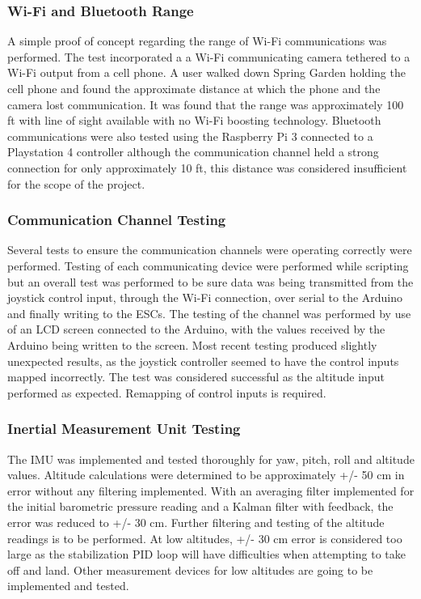   \subsubsection{Wi-Fi and Bluetooth Range}
  
  A simple proof of concept regarding the range of Wi-Fi communications was performed. The test incorporated a a Wi-Fi communicating camera tethered to a Wi-Fi output from a cell phone. A user walked down Spring Garden holding the cell phone and found the approximate distance at which the phone and the camera lost communication. It was found that the range was approximately 100 ft with line of sight available with no Wi-Fi boosting technology. Bluetooth communications were also tested using the Raspberry Pi 3 connected to a Playstation 4 controller although the communication channel held a strong connection for only approximately 10 ft, this distance was considered insufficient for the scope of the project.
  
 \subsubsection{Communication Channel Testing}
 
 Several tests to ensure the communication channels were operating correctly were performed. Testing of each communicating device were performed while scripting but an overall test was performed to be sure data was being transmitted from the joystick control input, through the Wi-Fi connection, over serial to the Arduino and finally writing to the ESCs. The testing of the channel was performed by use of an LCD screen connected to the Arduino, with the values received by the Arduino being written to the screen. Most recent testing produced slightly unexpected results, as the joystick controller seemed to have the control inputs mapped incorrectly. The test was considered successful as the altitude input performed as expected. Remapping of control inputs is required. 

\subsubsection{Inertial Measurement Unit Testing}

The IMU was implemented and tested thoroughly for yaw, pitch, roll and altitude values. Altitude calculations were determined to be approximately +/- 50 cm in error without any filtering implemented. With an averaging filter implemented for the initial barometric pressure reading and a Kalman filter with feedback, the error was reduced to +/- 30 cm. Further filtering and testing of the altitude readings is to be performed. At low altitudes, +/- 30 cm error is considered too large as the stabilization PID loop will have difficulties when attempting to take off and land. Other measurement devices for low altitudes are going to be implemented and tested.

